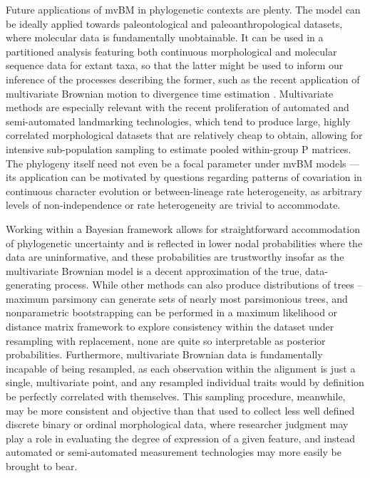 Future applications of mvBM in phylogenetic contexts are plenty. The model can be ideally applied towards paleontological and paleoanthropological datasets, where molecular data is fundamentally unobtainable. It can be used in a partitioned analysis featuring both continuous morphological and molecular sequence data for extant taxa, so that the latter might be used to inform our inference of the processes describing the former, such as the recent application of multivariate Brownian motion to divergence time estimation \citep{alvarez-carreteroBayesianEstimationSpecies2019}. Multivariate methods are especially relevant with the recent proliferation of automated and semi-automated landmarking technologies, which tend to produce large, highly correlated morphological datasets that are relatively cheap to obtain, allowing for intensive sub-population sampling to estimate pooled within-group P matrices. The phylogeny itself need not even be a focal parameter under mvBM models — its application can be motivated by questions regarding patterns of covariation in continuous character evolution or between-lineage rate heterogeneity, as arbitrary levels of non-independence or rate heterogeneity are trivial to accommodate. 

Working within a Bayesian framework allows for straightforward accommodation of phylogenetic uncertainty and is reflected in lower nodal probabilities where the data are uninformative, and these probabilities are trustworthy insofar as the multivariate Brownian model is a decent approximation of the true, data-generating process. While other methods can also produce distributions of trees – maximum parsimony can generate sets of nearly most parsimonious trees, and nonparametric bootstrapping can be performed in a maximum likelihood or distance matrix framework to explore consistency within the dataset under resampling with replacement, none are quite so interpretable as posterior probabilities. Furthermore, multivariate Brownian data is fundamentally incapable of being resampled, as each observation within the alignment is just a single, multivariate point, and any resampled individual traits would by definition be perfectly correlated with themselves. This sampling procedure, meanwhile, may be more consistent and objective than that used to collect less well defined discrete binary or ordinal morphological data, where researcher judgment may play a role in evaluating the degree of expression of a given feature, and instead automated or semi-automated measurement technologies may more easily be brought to bear.

